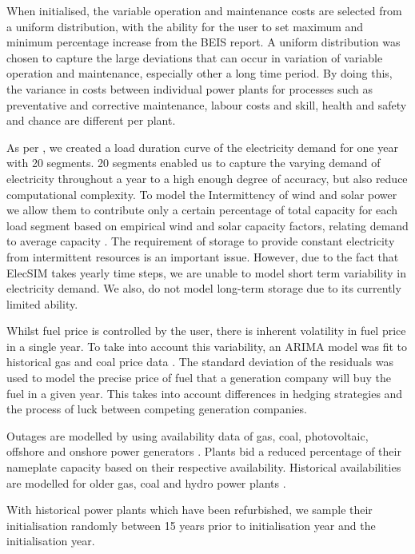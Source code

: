 When initialised, the variable operation and maintenance costs are selected from a uniform distribution, with the ability for the user to set maximum and minimum percentage increase from the BEIS report. A uniform distribution was chosen to capture the large deviations that can occur in variation of variable operation and maintenance, especially other a long time period. By doing this, the variance in costs between individual power plants for processes such as preventative and corrective maintenance, labour costs and skill, health and safety and chance are different per plant.  

As per \cite{Chappin2017}, we created a load duration curve of the electricity demand for one year with 20 segments. 20 segments enabled us to capture the varying demand of electricity throughout a year to a high enough degree of accuracy, but also reduce computational complexity. To model the Intermittency of wind and solar power we allow them to contribute only a certain percentage of total capacity for each load segment based on empirical wind and solar capacity factors, relating demand to average capacity \cite{Pfenninger2016, Staffell2016, Chappin2017}. The requirement of storage to provide constant electricity from intermittent resources is an important issue. However, due to the fact that ElecSIM takes yearly time steps, we are unable to model short term variability in electricity demand. We also, do not model long-term storage due to its currently limited ability. 

Whilst fuel price is controlled by the user, there is inherent volatility in fuel price in a single year. To take into account this variability, an ARIMA model was fit to historical gas and coal price data \cite{coalprices,gasprices}. The standard deviation of the residuals was used to model the precise price of fuel that a generation company will buy the fuel in a given year. This takes into account differences in hedging strategies and the process of luck between competing generation companies.

Outages are modelled by using availability data of gas, coal, photovoltaic, offshore and onshore power generators \cite{Ltd2016, Hunt2015, carroll-j}. Plants bid a reduced percentage of their nameplate capacity based on their respective availability. Historical availabilities are modelled for older gas, coal and hydro power plants \cite{AlbertaSystemElectricOperator2016}.

With historical power plants which have been refurbished, we sample their initialisation randomly between 15 years prior to initialisation year and the initialisation year.

